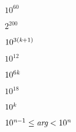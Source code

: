{\newpage
\clearpage
\samepage $10^60$
}

{\newpage
\clearpage
\samepage $2^{200}$
}

{\newpage
\clearpage
\samepage $10^{3(\hbox{\scriptsize\it k}+1)}$
}

{\newpage
\clearpage
\samepage $10^{12}$
}

{\newpage
\clearpage
\samepage $10^{6\hbox{\scriptsize\it k}}$
}

{\newpage
\clearpage
\samepage $10^{18}$
}

{\newpage
\clearpage
\samepage $10^{\hbox{\scriptsize\it k}}$
}

{\newpage
\clearpage
\samepage \(10^{\hbox{\scriptsize\it n}-1}\leq\hbox{\it arg}<10^{\hbox{\scriptsize\it n}}\)
}

{\newpage
\clearpage
\samepage \Xarrowdown
}

